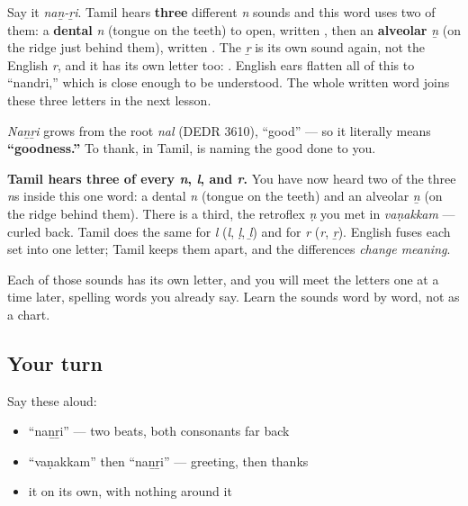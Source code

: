 \begin{sounds}
Say it \emph{naṉ-ṟi}. Tamil hears \textbf{three} different \emph{n} sounds and this word uses two of them: a \textbf{dental} \emph{n} (tongue on the teeth) to open, written \textbf{}, then an \textbf{alveolar} \emph{ṉ} (on the ridge just behind them), written \textbf{}. The \emph{ṟ} is its own sound again, not the English \emph{r}, and it has its own letter too: \textbf{}. English ears flatten all of this to “nandri,” which is close enough to be understood. The whole written word joins these three letters in the next lesson.
\end{sounds}

\begin{cousinweb}
\emph{Naṉṟi} grows from the root \emph{nal} (DEDR 3610), “good” — so it literally means \textbf{“goodness.”} To thank, in Tamil, is naming the good done to you.
\end{cousinweb}

\begin{grammarlens}[title={Grammar lens}]
\textbf{Tamil hears three of every \emph{n}, \emph{l}, and \emph{r}.} You have now heard two of the three \emph{n}s inside this one word: a dental \emph{n} (tongue on the teeth) and an alveolar \emph{ṉ} (on the ridge behind them). There is a third, the retroflex \emph{ṇ} you met in \emph{vaṇakkam} — curled back. Tamil does the same for \emph{l} (\emph{l}, \emph{ḷ}, \emph{ḻ}) and for \emph{r} (\emph{r}, \emph{ṟ}). English fuses each set into one letter; Tamil keeps them apart, and the differences \emph{change meaning}.

Each of those sounds has its own letter, and you will meet the letters one at a time later, spelling words you already say. Learn the sounds word by word, not as a chart.
\end{grammarlens}

\subsection*{Your turn}
Say these aloud:

\begin{itemize}
\raggedright
  \item \textquotedblleft{}naṉṟi\textquotedblright{} — two beats, both consonants far back
  \item \textquotedblleft{}vaṇakkam\textquotedblright{} then \textquotedblleft{}naṉṟi\textquotedblright{} — greeting, then thanks
  \item it on its own, with nothing around it
\end{itemize}

